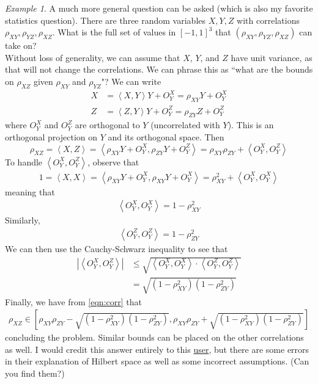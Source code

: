 \documentclass[11pt]{article}
\newcommand{\ip}[2]{\left\langle #1, #2\right\rangle}
\theoremstyle{plain}
\theoremstyle{definition}
\theoremstyle{remark}
\newtheorem{exm}{Example}[section]
\begin{document}
\begin{exm}
    A much more general question can be asked (which is also my favorite statistics question). There are three random variables $X, Y, Z$ with correlations $\rho_{XY}, \rho_{YZ}, \rho_{XZ}$. What is the full set of values in $[-1,1]^3$ that $(\rho_{XY}, \rho_{YZ}, \rho_{XZ})$ can take on?\\ 
    
    Without loss of generality, we can assume that $X$, $Y$, and $Z$ have unit variance, as that will not change the correlations. We can phrase this as ``what are the bounds on $\rho_{XZ}$ given $\rho_{XY}$ and $\rho_{YZ}$"? We can write 
    \begin{align*}
        X &= \ip{X}{Y}Y + O_Y^X = \rho_{XY}Y + O_Y^X\\
        Z &= \ip{Z}{Y}Y + O_Y^Z = \rho_{ZY}Z + O_Y^Z
    \end{align*}
    where $O_Y^X$ and $O_Y^Z$ are orthogonal to $Y$ (uncorrelated with $Y$). This is an orthogonal projection on $Y$ and its orthogonal space. Then
    \begin{equation}
        \rho_{XZ} = \ip{X}{Z} = \ip{\rho_{XY}Y + O_Y^X}{\rho_{ZY}Y + O_Y^Z} = \rho_{XY}\rho_{ZY} + \ip{O_Y^X}{O_Y^Z}
        \label{eqn:corr}
    \end{equation}
    To handle $\ip{O_Y^X}{O_Y^Z}$, observe that
    \begin{align*}
        1 = \ip{X}{X} = \ip{\rho_{XY}Y + O_Y^X}{ \rho_{XY}Y + O_Y^X} = \rho_{XY}^2 + \ip{O_Y^X}{O_Y^X}
    \end{align*}
    meaning that
    \begin{align*}
        \ip{O_Y^X}{O_Y^X} = 1 - \rho_{XY}^2
    \end{align*}
    Similarly,
    \begin{align*}
        \ip{O_Y^Z}{O_Y^Z} = 1 - \rho_{ZY}^2
    \end{align*}
    We can then use the Cauchy-Schwarz inequality to see that
    \begin{align*}
        |\ip{O_Y^X}{O_Y^Z}| &\leq \sqrt{\ip{O_Y^X}{O_Y^X} \cdot \ip{O_Y^Z}{O_Y^Z}}\\
        &= \sqrt{(1 - \rho_{XY}^2)(1 - \rho_{ZY}^2)}
    \end{align*}
    Finally, we have from \ref{eqn:corr} that
    \begin{align*}
        \rho_{XZ} \in \left[\rho_{XY}\rho_{ZY} - \sqrt{(1 - \rho_{XY}^2)(1 - \rho_{ZY}^2)}, \rho_{XY}\rho_{ZY} + \sqrt{(1 - \rho_{XY}^2)(1 - \rho_{ZY}^2)}\right]
    \end{align*}
    concluding the problem. Similar bounds can be placed on the other correlations as well. I would credit this answer entirely to this \href{https://math.stackexchange.com/questions/284877/correlation-between-three-variables-question}{user}, but there are some errors in their explanation of Hilbert space as well as some incorrect assumptions. (Can you find them?)
\end{exm}
\end{document}
